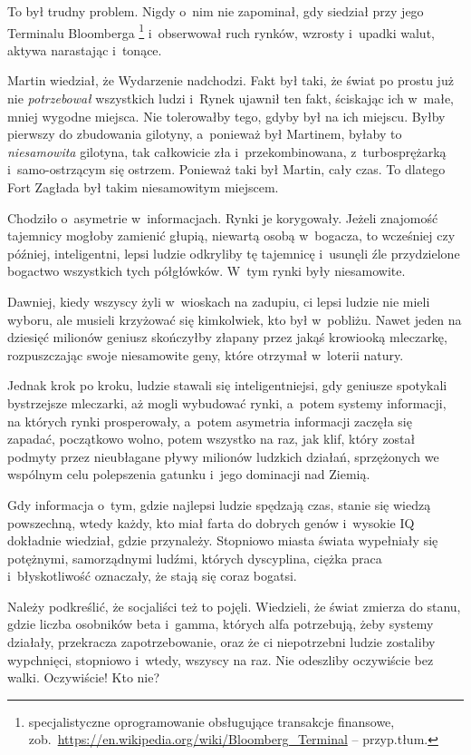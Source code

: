 \documentclass[oneside,polish,11pt,sfheadings]{mwbk}
\begin{document}
To był trudny problem. Nigdy o~nim nie zapominał, gdy siedział przy jego
Terminalu Bloomberga \footnote{ specjalistyczne oprogramowanie obsługujące
transakcje finansowe, zob.~\url{https://en.wikipedia.org/wiki/Bloomberg\_Terminal} -- przyp.tłum. } i~obserwował ruch rynków, wzrosty i~upadki walut, aktywa
narastając i~tonące.

Martin wiedział, że Wydarzenie nadchodzi. Fakt był taki, że świat po
prostu już nie \textit{potrzebował} wszystkich ludzi i~Rynek ujawnił ten
fakt, ściskając ich w~małe, mniej wygodne miejsca. Nie tolerowałby tego,
gdyby był na ich miejscu. Byłby pierwszy do zbudowania gilotyny, a~ponieważ był Martinem, byłaby to \textit{niesamowita} gilotyna, tak
całkowicie zła i~przekombinowana, z~turbosprężarką i~samo-ostrzącym się
ostrzem. Ponieważ taki był Martin, cały czas. To dlatego Fort Zagłada
był takim niesamowitym miejscem.

Chodziło o~asymetrie w~informacjach. Rynki je korygowały. Jeżeli
znajomość tajemnicy mogłoby zamienić głupią, niewartą osobą w~bogacza,
to wcześniej czy później, inteligentni, lepsi ludzie odkryliby tę
tajemnicę i~usunęli źle przydzielone bogactwo wszystkich tych
półgłówków. W~tym rynki były niesamowite.

Dawniej, kiedy wszyscy żyli w~wioskach na zadupiu, ci lepsi ludzie nie
mieli wyboru, ale musieli krzyżować się kimkolwiek, kto był w~pobliżu.
Nawet jeden na dziesięć milionów geniusz skończyłby złapany przez jakąś
krowiooką mleczarkę, rozpuszczając swoje niesamowite geny, które
otrzymał w~loterii natury.

Jednak krok po kroku, ludzie stawali się inteligentniejsi, gdy geniusze
spotykali bystrzejsze mleczarki, aż mogli wybudować rynki, a~potem
systemy informacji, na których rynki prosperowały, a~potem asymetria
informacji zaczęła się zapadać, początkowo wolno, potem wszystko na raz,
jak klif, który został podmyty przez nieubłagane pływy milionów ludzkich
działań, sprzężonych we wspólnym celu polepszenia gatunku i~jego
dominacji nad Ziemią.

Gdy informacja o~tym, gdzie najlepsi ludzie spędzają czas, stanie się
wiedzą powszechną, wtedy każdy, kto miał farta do dobrych genów i~wysokie IQ dokładnie wiedział, gdzie przynależy. Stopniowo miasta świata
wypełniały się potężnymi, samorządnymi ludźmi, których dyscyplina,
ciężka praca i~błyskotliwość oznaczały, że stają się coraz bogatsi.

Należy podkreślić, że socjaliści też to pojęli. Wiedzieli, że świat
zmierza do stanu, gdzie liczba osobników beta i~gamma, których alfa
potrzebują, żeby systemy działały, przekracza zapotrzebowanie, oraz że
ci niepotrzebni ludzie zostaliby wypchnięci, stopniowo i~wtedy, wszyscy
na raz. Nie odeszliby oczywiście bez walki. Oczywiście! Kto nie?
\end{document}
